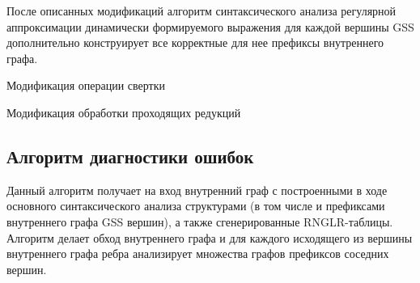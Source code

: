 После описанных модификаций алгоритм синтаксического анализа регулярной аппроксимации динамически формируемого выражения для каждой вершины GSS дополнительно конструирует все корректные для нее префиксы внутреннего графа.

\begin{algorithm}[H]
\begin{algorithmic}[1]
\caption{Модификация операции свертки}
\label{reduce_mod}
      \EndIf
    \EndFor
  \EndWhile
\EndFunction
\end{algorithmic}
\end{algorithm}

\begin{algorithm}[H]
\begin{algorithmic}[1]
\caption{Модификация обработки проходящих редукций}
\label{reduce_mod}
      \EndFor
    \EndFor
  \EndFor
\EndFunction
\end{algorithmic}
\end{algorithm}

\subsection{Алгоритм диагностики ошибок}
Данный алгоритм получает на вход внутренний граф с построенными в ходе основного синтаксического анализа структурами (в том числе и префиксами внутреннего графа GSS вершин), а также сгенерированные RNGLR-таблицы. Алгоритм делает обход внутреннего графа и для каждого исходящего из вершины внутреннего графа ребра анализирует множества графов префиксов соседних вершин. 

